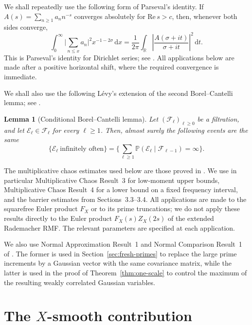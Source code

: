 \documentclass[a4paper,12pt,reqno]{amsart}
\numberwithin{equation}{section}
\newtheorem{lemma}[theorem]{Lemma}
\theoremstyle{remark}
\newcommand{\R}{\mathbb{R}}
\newcommand{\p}{\mathbb{P}}
\begin{document}
We shall repeatedly use the following form of Parseval's identity.  If
$A(s)=\sum_{n\geq1}a_nn^{-s}$ converges absolutely for $\mathrm{Re}\,s>c$, then, whenever both sides converge,
\begin{equation}\label{eq:parseval-dirichlet}
 \int_0^\infty\Big|\sum_{n\leq x}a_n\Big|^2x^{-1-2\sigma}\,\mathrm{d}x
 =\frac1{2\pi}\int_\R
   \left|\frac{A(\sigma+it)}{\sigma+it}\right|^2\,\mathrm{d}t.
\end{equation}
This is Parseval's identity for Dirichlet series; see
\cite[Section~5.1, especially (5.26)]{MontgomeryVaughan2007}.
All applications below are made after a positive horizontal shift, where
the required convergence is immediate.

We shall also use the following L\'evy's extension of the second
Borel--Cantelli lemma; see \cite[Theorem~4.3.4]{Durrett2019}.

\begin{lemma}[Conditional Borel--Cantelli lemma]
\label{lem:conditional-borel-cantelli}
Let $(\mathscr F_\ell)_{\ell\geq0}$ be a filtration, and let
$\mathcal E_\ell\in\mathscr F_\ell$ for every $\ell\geq1$. Then, almost surely the following events are the same
\[
 \{\mathcal E_\ell\ \text{infinitely often}\}
 =
 \bigg\{
 \sum_{\ell\geq1}
 \p(\mathcal E_\ell\mid\mathscr F_{\ell-1})
 =\infty
 \bigg\}.
\]
\end{lemma}

The multiplicative chaos estimates used below are those proved in
\cite[Sections~2.3--2.4]{Harper2023Large}. We use in particular
Multiplicative Chaos Result~3 for low-moment upper bounds,
Multiplicative Chaos Result~4 for a lower bound on a fixed frequency interval, and the
barrier estimates from Sections~3.3--3.4. All applications are made to
the squarefree Euler product \(F_X\) or to its prime truncations; we do
not apply these results directly to the Euler product \(F_X(s)Z_X(2s)\)
of the extended Rademacher RMF. The relevant parameters are specified at each
application.

We also use Normal Approximation Result~1 and Normal Comparison
Result~1 of \cite{Harper2023Large}. The former is used in
Section~\ref{sec:fresh-primes} to replace the large prime increments by a Gaussian vector with the same covariance matrix, while
the latter is used in the proof of Theorem~\ref{thm:one-scale} to control
the maximum of the resulting weakly correlated Gaussian variables.

\section{The \texorpdfstring{$X$}{X}-smooth contribution}\label{sec:old-primes}
\end{document}
